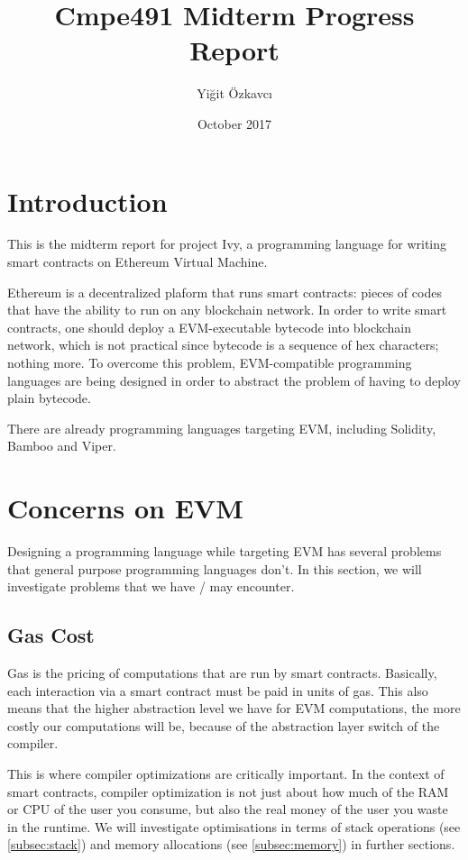 \documentclass{article}
\title{Cmpe491 Midterm Progress Report}
\author{Yiğit Özkavcı}
\date{October 2017}
\begin{document}
\maketitle

\tableofcontents

\newpage

\section{Introduction}
\par 
\par This is the midterm report for project Ivy, a programming language for writing smart contracts on Ethereum Virtual Machine.
\par Ethereum is a decentralized plaform that runs smart contracts: pieces of codes that have the ability to run on any blockchain network. In order to write smart contracts, one should deploy a EVM-executable bytecode into blockchain network, which is not practical since bytecode is a sequence of hex characters; nothing more. To overcome this problem, EVM-compatible programming languages are being designed in order to abstract the problem of having to deploy plain bytecode. 
\par There are already programming languages targeting EVM, including Solidity\cite{solidity}, Bamboo\cite{bamboo} and Viper\cite{viper}. 

\section{Concerns on EVM}
Designing a programming language while targeting EVM has several problems that general purpose programming languages don't. In this section, we will investigate problems that we have / may encounter.

\subsection{Gas Cost}
\par Gas is the pricing of computations that are run by smart contracts. Basically, each interaction via a smart contract must be paid in units of gas. This also means that the higher abstraction level we have for EVM computations, the more costly our computations will be, because of the abstraction layer switch of the compiler.
\par This is where compiler optimizations are critically important. In the context of smart contracts, compiler optimization is not just about how much of the RAM or CPU of the user you consume, but also the real money of the user you waste in the runtime. We will investigate optimisations in terms of stack operations (see \ref{subsec:stack}) and memory allocations (see \ref{subsec:memory}) in further sections.
\end{document}
